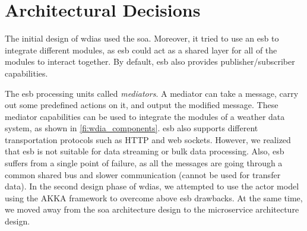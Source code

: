 \section{Architectural Decisions}
\label{se:architectural_decisions}

The initial design of \acrshort{wdias} used the \acrfull{soa}. Moreover, it tried to use an \acrfull{esb} to integrate different modules, as \acrshort{esb} could act as a shared layer for all of the modules to interact together. By default, \acrshort{esb} also provides publisher/subscriber capabilities.

The \acrshort{esb} processing units called \emph{mediators}. A mediator can take a message, carry out some predefined actions on it, and output the modified message. These mediator capabilities can be used to integrate the modules of a weather data system, as shown in \cref{fi:wdia_components}. \acrshort{esb} also supports different transportation protocols such as HTTP and web sockets. However, we realized that \acrshort{esb} is not suitable for data streaming or bulk data processing. Also, \acrshort{esb} suffers from a single point of failure, as all the messages are going through a common shared bus and slower communication (cannot be used for transfer data). In the second design phase of \acrshort{wdias}, we attempted to use the actor model using the AKKA framework \cite{HewittWhyModel} to overcome above \acrshort{esb} drawbacks. At the same time, we moved away from the \acrshort{soa} architecture design to the microservice architecture design.

